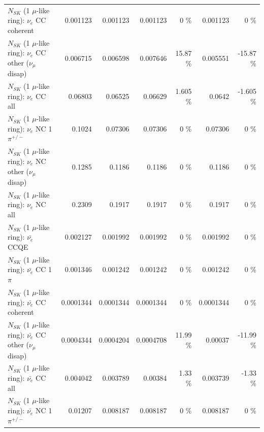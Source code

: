 \begin{table}
\begin{tabular}{| l | r | r | r  r | r  r |}
                               $N_{SK}$ (1 $\mu$-like ring): $\nu_e$ CC coherent &        0.001123 &        0.001123 &        0.001123 &        0 \%  &        0.001123 &        0 \%  \\ 
                $N_{SK}$ (1 $\mu$-like ring): $\nu_e$ CC other ($\nu_\mu$ disap) &        0.006715 &        0.006598 &        0.007646 &    15.87 \%  &        0.005551 &   -15.87 \%  \\ 
                                  $N_{SK}$ (1 $\mu$-like ring): $\nu_{e}$ CC all &         0.06803 &         0.06525 &         0.06629 &    1.605 \%  &          0.0642 &   -1.605 \%  \\ 
\hline
                           $N_{SK}$ (1 $\mu$-like ring): $\nu_e$ NC 1$\pi^{+/-}$ &          0.1024 &         0.07306 &         0.07306 &        0 \%  &         0.07306 &        0 \%  \\ 
                $N_{SK}$ (1 $\mu$-like ring): $\nu_e$ NC other ($\nu_\mu$ disap) &          0.1285 &          0.1186 &          0.1186 &        0 \%  &          0.1186 &        0 \%  \\ 
                                  $N_{SK}$ (1 $\mu$-like ring): $\nu_{e}$ NC all &          0.2309 &          0.1917 &          0.1917 &        0 \%  &          0.1917 &        0 \%  \\ 
\hline
\hline
\hline
                                $N_{SK}$ (1 $\mu$-like ring): $\bar{\nu_e}$ CCQE &        0.002127 &        0.001992 &        0.001992 &        0 \%  &        0.001992 &        0 \%  \\ 
                           $N_{SK}$ (1 $\mu$-like ring): $\bar{\nu_e}$ CC 1$\pi$ &        0.001346 &        0.001242 &        0.001242 &        0 \%  &        0.001242 &        0 \%  \\ 
                         $N_{SK}$ (1 $\mu$-like ring): $\bar{\nu_e}$ CC coherent &       0.0001344 &       0.0001344 &       0.0001344 &        0 \%  &       0.0001344 &        0 \%  \\ 
          $N_{SK}$ (1 $\mu$-like ring): $\bar{\nu_e}$ CC other ($\nu_\mu$ disap) &       0.0004344 &       0.0004204 &       0.0004708 &    11.99 \%  &         0.00037 &   -11.99 \%  \\ 
                            $N_{SK}$ (1 $\mu$-like ring): $\bar{\nu_{e}}$ CC all &        0.004042 &        0.003789 &         0.00384 &     1.33 \%  &        0.003739 &    -1.33 \%  \\ 
\hline
                     $N_{SK}$ (1 $\mu$-like ring): $\bar{\nu_e}$ NC 1$\pi^{+/-}$ &         0.01207 &        0.008187 &        0.008187 &        0 \%  &        0.008187 &        0 \%  \\ 

\end{tabular}
\end{table}
